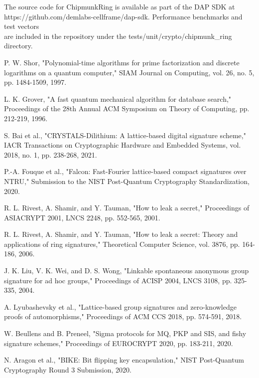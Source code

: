 \documentclass[11pt,a4paper]{article}
\begin{document}
The source code for ChipmunkRing is available as part of the DAP SDK at \\
https://github.com/demlabs-cellframe/dap-sdk. Performance benchmarks and test vectors \\
are included in the repository under the tests/unit/crypto/chipmunk\_ring directory.





\begin{thebibliography}{99}

P. W. Shor, "Polynomial-time algorithms for prime factorization and discrete logarithms on a quantum computer," SIAM Journal on Computing, vol. 26, no. 5, pp. 1484-1509, 1997.

L. K. Grover, "A fast quantum mechanical algorithm for database search," Proceedings of the 28th Annual ACM Symposium on Theory of Computing, pp. 212-219, 1996.

S. Bai et al., "CRYSTALS-Dilithium: A lattice-based digital signature scheme," IACR Transactions on Cryptographic Hardware and Embedded Systems, vol. 2018, no. 1, pp. 238-268, 2021.

P.-A. Fouque et al., "Falcon: Fast-Fourier lattice-based compact signatures over NTRU," Submission to the NIST Post-Quantum Cryptography Standardization, 2020.

R. L. Rivest, A. Shamir, and Y. Tauman, "How to leak a secret," Proceedings of ASIACRYPT 2001, LNCS 2248, pp. 552-565, 2001.

R. L. Rivest, A. Shamir, and Y. Tauman, "How to leak a secret: Theory and applications of ring signatures," Theoretical Computer Science, vol. 3876, pp. 164-186, 2006.

J. K. Liu, V. K. Wei, and D. S. Wong, "Linkable spontaneous anonymous group signature for ad hoc groups," Proceedings of ACISP 2004, LNCS 3108, pp. 325-335, 2004.

A. Lyubashevsky et al., "Lattice-based group signatures and zero-knowledge proofs of automorphisms," Proceedings of ACM CCS 2018, pp. 574-591, 2018.

W. Beullens and B. Preneel, "Sigma protocols for MQ, PKP and SIS, and fishy signature schemes," Proceedings of EUROCRYPT 2020, pp. 183-211, 2020.

N. Aragon et al., "BIKE: Bit flipping key encapsulation," NIST Post-Quantum Cryptography Round 3 Submission, 2020.


\end{thebibliography}
\end{document}

